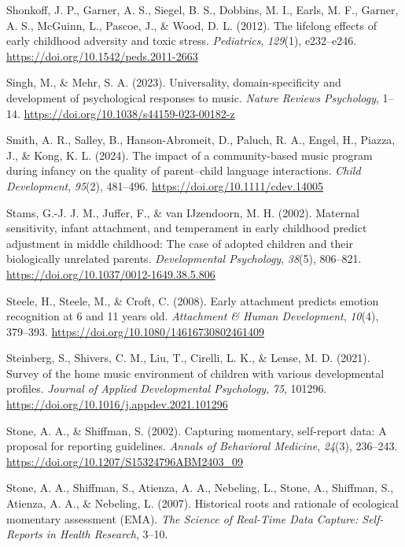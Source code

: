\documentclass[
]{article}
\newlength{\cslhangindent}
\newenvironment{CSLReferences}[2] %
 {\begin{list}{}{%
  \setlength{\itemindent}{0pt}
  \setlength{\leftmargin}{0pt}
  \setlength{\parsep}{0pt}
  \ifodd #1
   \setlength{\leftmargin}{\cslhangindent}
   \setlength{\itemindent}{-1\cslhangindent}
  \fi
  \setlength{\itemsep}{#2\baselineskip}}}
 {\end{list}}
\begin{document}
\begin{CSLReferences}{1}{0}
Shonkoff, J. P., Garner, A. S., Siegel, B. S., Dobbins, M. I., Earls, M.
F., Garner, A. S., McGuinn, L., Pascoe, J., \& Wood, D. L. (2012). The
lifelong effects of early childhood adversity and toxic stress.
\emph{Pediatrics}, \emph{129}(1), e232--e246.
\url{https://doi.org/10.1542/peds.2011-2663}

Singh, M., \& Mehr, S. A. (2023). Universality, domain-specificity and
development of psychological responses to music. \emph{Nature Reviews
Psychology}, 1--14. \url{https://doi.org/10.1038/s44159-023-00182-z}

Smith, A. R., Salley, B., Hanson-Abromeit, D., Paluch, R. A., Engel, H.,
Piazza, J., \& Kong, K. L. (2024). The impact of a community-based music
program during infancy on the quality of parent--child language
interactions. \emph{Child Development}, \emph{95}(2), 481--496.
\url{https://doi.org/10.1111/cdev.14005}

Stams, G.-J. J. M., Juffer, F., \& van IJzendoorn, M. H. (2002).
Maternal sensitivity, infant attachment, and temperament in early
childhood predict adjustment in middle childhood: {The} case of adopted
children and their biologically unrelated parents. \emph{Developmental
Psychology}, \emph{38}(5), 806--821.
\url{https://doi.org/10.1037/0012-1649.38.5.806}

Steele, H., Steele, M., \& Croft, C. (2008). Early attachment predicts
emotion recognition at 6 and 11 years old. \emph{Attachment \& Human
Development}, \emph{10}(4), 379--393.
\url{https://doi.org/10.1080/14616730802461409}

Steinberg, S., Shivers, C. M., Liu, T., Cirelli, L. K., \& Lense, M. D.
(2021). Survey of the home music environment of children with various
developmental profiles. \emph{Journal of Applied Developmental
Psychology}, \emph{75}, 101296.
\url{https://doi.org/10.1016/j.appdev.2021.101296}

Stone, A. A., \& Shiffman, S. (2002). Capturing momentary, self-report
data: {A} proposal for reporting guidelines. \emph{Annals of Behavioral
Medicine}, \emph{24}(3), 236--243.
\url{https://doi.org/10.1207/S15324796ABM2403_09}

Stone, A. A., Shiffman, S., Atienza, A. A., Nebeling, L., Stone, A.,
Shiffman, S., Atienza, A. A., \& Nebeling, L. (2007). Historical roots
and rationale of ecological momentary assessment ({EMA}). \emph{The
Science of Real-Time Data Capture: Self-Reports in Health Research},
3--10.


\end{CSLReferences}
\end{document}

